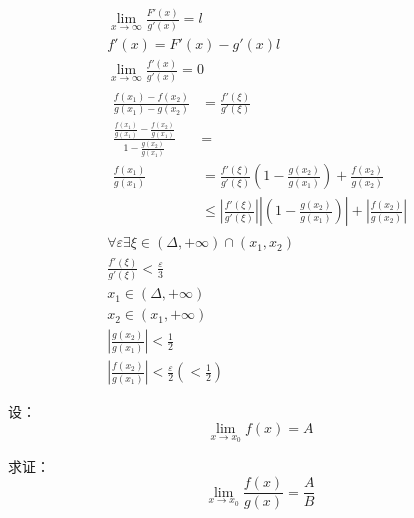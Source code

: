 \documentclass{article}
\begin{document}
\begin{gather*}
  \lim_{x \to \infty}\frac{F'(x)}{g'(x)} = l \\
  f'(x) = F'(x) - g'(x)l \\
  \lim_{x \to \infty}\frac{f'(x)}{g'(x)} = 0 \\
  \begin{aligned}
    \frac{f(x_1) - f(x_2)}{g(x_1) - g(x_2)} &= \frac{f'(\xi)}{g'(\xi)} \\
    \frac{\frac{f(x_1)}{g(x_1)} - \frac{f(x_2)}{g(x_1)}}{1 - \frac{g(x_2)}{g(x_1)}} &= \\
    \frac{f(x_1)}{g(x_1)} &= \frac{f'(\xi)}{g'(\xi)}\left(1 - \frac{g(x_2)}{g(x_1)}\right) + \frac{f(x_2)}{g(x_2)} \\
                          &\leq \left\lvert \frac{f'(\xi)}{g'(\xi)} \right\rvert
                             \left\lvert (1 - \frac{g(x_2)}{g(x_1)}) \right\rvert
                             + \left\lvert \frac{f(x_2)}{g(x_2)} \right\rvert
  \end{aligned} \\
  \forall \varepsilon \exists \xi \in (\Delta, +\infty) \cap (x_1, x_2) \\
  \frac{f'(\xi)}{g'(\xi)} < \frac{\varepsilon}{3} \\
  x_1 \in (\Delta, +\infty) \\
  x_2 \in (x_1, +\infty) \\
  \left\lvert\frac{g(x_2)}{g(x_1)}\right\rvert < \frac{1}{2} \\
  \left\lvert\frac{f(x_2)}{g(x_1)}\right\rvert < \frac{\varepsilon}{2} \left(< \frac{1}{2} \right)
\end{gather*}


设：
\[
  \lim_{x \rightarrow x_{0}}{f\left( x \right)}=A
\]

求证：
\[
  \lim_{x \rightarrow x_0}{\frac{f\left( x \right)}{g\left( x \right)}}=\frac{A}{B}
\]
\end{document}
